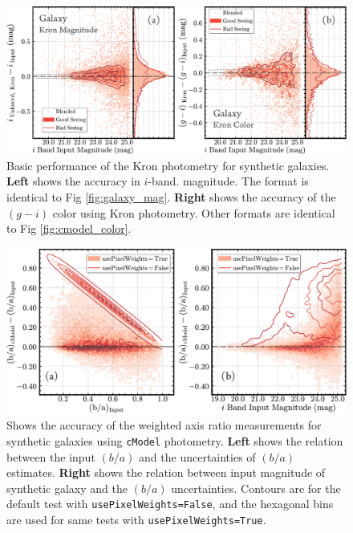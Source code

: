 \documentclass[useamsfonts]{pasj01}
\def\cmodel{\texttt{cModel}}
\begin{document}
\begin{figure}
    \begin{center}
        \includegraphics[width=\textwidth]{fig/synpipe_galaxy_kron}
    \end{center}
    \caption{
        Basic performance of the Kron photometry for synthetic galaxies.
        \textbf{Left} shows the accuracy in $i$-band.
        magnitude. The format is identical to Fig \ref{fig:galaxy_mag}.
        \textbf{Right} shows the accuracy of the $(g-i)$ color using
        Kron photometry.
        Other formats are identical to Fig \ref{fig:cmodel_color}.
        }
    \label{fig:galaxy_kron}
\end{figure}

\begin{figure}
    \begin{center}
        \includegraphics[width=\textwidth]{fig/synpipe_galaxy_ba}
    \end{center}
    \caption{
        Shows the accuracy of the weighted axis ratio measurements for synthetic
        galaxies using \cmodel{} photometry.
        \textbf{Left} shows the relation between the input $(b/a)$ and the
        uncertainties of $(b/a)$ estimates.
        \textbf{Right} shows the relation between input magnitude of synthetic galaxy
        and the $(b/a)$ uncertainties.
        Contours are for the default test with \texttt{usePixelWeights=False}, and the
        hexagonal bins are used for same tests with \texttt{usePixelWeights=True}.
        }
    \label{fig:galaxy_ba}
\end{figure}
\end{document}
